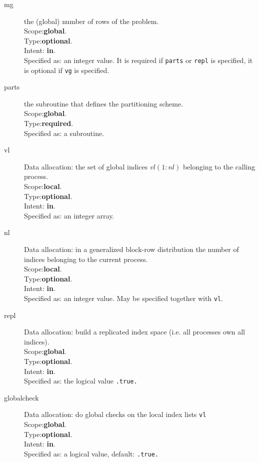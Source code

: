 \begin{description}
\item[mg] the (global) number of rows of the problem.\\
Scope:{\bf global}.\\
Type:{\bf optional}.\\
Intent: {\bf in}.\\
Specified as: an integer value. It is required if \verb|parts| or
\verb|repl| is specified, it is optional if \verb|vg| is specified. 
\item[parts] the subroutine that defines the partitioning scheme.\\
Scope:{\bf global}.\\
Type:{\bf required}.\\
Specified as: a subroutine. 
\item[vl] Data allocation: the set of global indices 
  $vl(1:nl)$ belonging to the calling process. \\
Scope:{\bf local}.\\
Type:{\bf optional}.\\
Intent: {\bf in}.\\
Specified as: an integer array. 
\item[nl] Data allocation: in a generalized block-row distribution the
  number of indices belonging to the current process. \\
Scope:{\bf local}.\\
Type:{\bf optional}.\\
Intent: {\bf in}.\\
Specified as: an integer value. May be specified together with
\verb|vl|. 
\item[repl] Data allocation: build a replicated index space (i.e. all
  processes own all indices).\\
Scope:{\bf global}.\\
Type:{\bf optional}.\\
Intent: {\bf in}.\\
Specified as: the logical value \verb|.true.|
\item[globalcheck] Data allocation: do global checks on the local
  index lists \verb|vl|\\
Scope:{\bf global}.\\
Type:{\bf optional}.\\
Intent: {\bf in}.\\
Specified as: a logical value, default: \verb|.true.|
\end{description}


